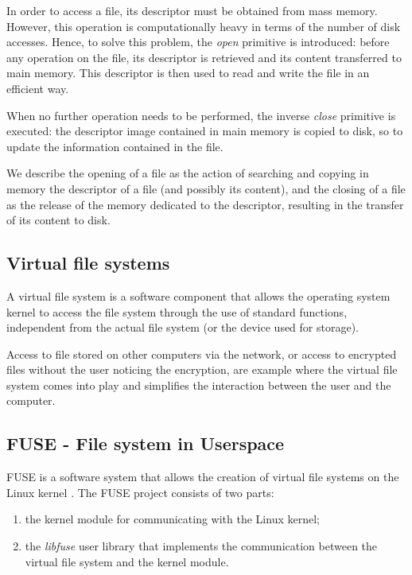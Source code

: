 \documentclass[a4paper,12pt,twoside,openright]{report}
\begin{document}
  In order to access a file, its descriptor must be obtained from mass memory.
  However, this operation is computationally heavy in terms of the number of disk accesses.
  Hence, to solve this problem, the \textit{open} primitive is introduced: before any operation
  on the file, its descriptor is retrieved and its content transferred to main memory.
  This descriptor is then used to read and write the file in an efficient way.
  
  When no further operation needs to be performed, the inverse \textit{close} primitive is executed:
  the descriptor image contained in main memory is copied to disk, so to update the information
  contained in the file.

  We describe the opening of a file as the action of searching and copying in memory the descriptor of a file
  (and possibly its content), and the closing of a file as the release of the memory dedicated to
  the descriptor, resulting in the transfer of its content to disk.
  
  \subsection{Virtual file systems}

  A virtual file system is a software component that allows the operating system kernel to access the file system
  through the use of standard functions, independent from the actual file system (or the device used for storage).

  Access to file stored on other computers via the network, or access to encrypted files without the user
  noticing the encryption, are example where the virtual file system comes into play and simplifies the interaction
  between the user and the computer.

  \subsection{FUSE - File system in Userspace}

  FUSE is a software system that allows the creation of virtual file systems on the Linux kernel \cite{libfusegithub}.
  The FUSE project consists of two parts:
  \begin{enumerate}
    \item the kernel module for communicating with the Linux kernel;
    \item the \textit{libfuse} user library that implements the communication between the virtual file system and the kernel module.
  \end{enumerate}
\end{document}
